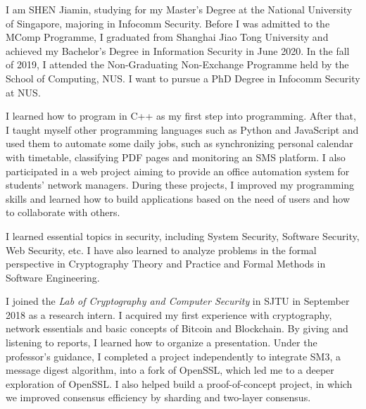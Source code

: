 \documentclass[11pt, a4paper]{awesome-cv}
\begin{document}
\renewcommand{\bodyfontlight}{\sourcesanspro}

\makecvheader %


\vspace{1em}


\begin{cvletter}


    I am SHEN Jiamin, studying for my Master's Degree at the National University of Singapore, majoring in Infocomm Security.
    Before I was admitted to the MComp Programme, I graduated from Shanghai Jiao Tong University and achieved my Bachelor's Degree in Information Security in June 2020.
    In the fall of 2019, I attended the Non-Graduating Non-Exchange Programme held by the School of Computing, NUS.
    I want to pursue a PhD Degree in Infocomm Security at NUS.


    I learned how to program in C++ as my first step into programming.
    After that, I taught myself other programming languages such as Python and JavaScript and used them to automate some daily jobs, such as synchronizing personal calendar with timetable, classifying PDF pages and monitoring an SMS platform.
    I also participated in a web project aiming to provide an office automation system for students' network managers.
    During these projects, I improved my programming skills and learned how to build applications based on the need of users and how to collaborate with others.

    I learned essential topics in security, including System Security, Software Security, Web Security, etc.
    I have also learned to analyze problems in the formal perspective in Cryptography Theory and Practice and Formal Methods in Software Engineering.


    I joined the \textit{Lab of Cryptography and Computer Security} in SJTU in September 2018 as a research intern. I acquired my first experience with cryptography, network essentials and basic concepts of Bitcoin and Blockchain.
    By giving and listening to reports, I learned how to organize a presentation.
    Under the professor's guidance, I completed a project independently to integrate SM3, a message digest algorithm, into a fork of OpenSSL, which led me to a deeper exploration of OpenSSL.
    I also helped build a proof-of-concept project, in which we improved consensus efficiency by sharding and two-layer consensus.


\end{cvletter}
\end{document}
